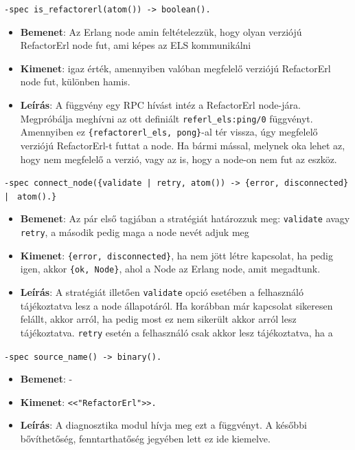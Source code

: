     \noindent \lstinline{-spec is_refactorerl(atom()) -> boolean().} 
    \begin{itemize}
            \item \textbf{Bemenet}: Az Erlang node amin feltételezzük, hogy olyan verziójú RefactorErl node fut, ami képes az ELS kommunikálni
            \item \textbf{Kimenet}: igaz érték, amennyiben valóban megfelelő verziójú RefactorErl node fut, különben hamis.
            \item \textbf{Leírás}: A függvény egy RPC hívást intéz a RefactorErl node-jára. Megpróbálja meghívni az ott definiált \lstinline{referl_els:ping/0} függvényt. Amennyiben ez \lstinline|{refactorerl_els, pong}|-al tér vissza, úgy megfelelő verziójú RefactorErl-t futtat a node. Ha bármi mással, melynek oka lehet az, hogy nem megfelelő a verzió, vagy az is, hogy a node-on nem fut az eszköz.
        \end{itemize}
    
    
        
    \noindent \lstinline|-spec connect_node({validate |\lstinline{| retry, atom()}\lstinline|) -> {error, disconnected} | \lstinline{|} \lstinline| atom().}| 
    \begin{itemize}
            \item \textbf{Bemenet}: Az pár első tagjában a stratégiát határozzuk meg: \lstinline{validate} avagy \lstinline{retry}, a második pedig maga a node nevét adjuk meg
            \item \textbf{Kimenet}: \lstinline|{error, disconnected}|, ha nem jött létre kapcsolat, ha pedig igen, akkor \lstinline|{ok, Node}|, ahol a Node az Erlang node, amit megadtunk.
            \item \textbf{Leírás}: A stratégiát illetően \lstinline{validate} opció esetében a felhasználó tájékoztatva lesz a node állapotáról. Ha korábban már kapcsolat sikeresen felállt, akkor arról, ha pedig most ez nem sikerült akkor arról lesz tájékoztatva. \lstinline{retry} esetén a felhasználó csak akkor lesz tájékoztatva, ha a   
        \end{itemize}
    
    
    
    \noindent \lstinline{-spec source_name() -> binary().}
    \begin{itemize}
            \item \textbf{Bemenet}: - 
            \item \textbf{Kimenet}: \lstinline{<<"RefactorErl">>.}
            \item \textbf{Leírás}: A diagnosztika modul hívja meg ezt a függvényt. A későbbi bővíthetőség, fenntarthatőség jegyében lett ez ide kiemelve.
        \end{itemize}
    
